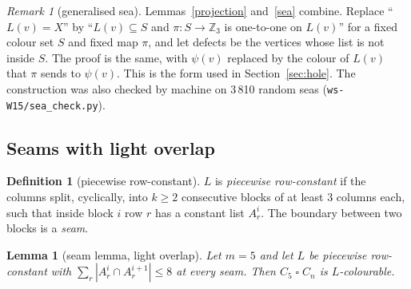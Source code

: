 \documentclass[11pt]{article}
\theoremstyle{plain}
\newtheorem{lemma}[theorem]{Lemma}
\theoremstyle{definition}
\newtheorem{definition}[theorem]{Definition}
\theoremstyle{remark}
\newtheorem{remark}[theorem]{Remark}
\newcommand{\T}{\mathbin{\square}}
\newcommand{\Z}{\mathbb{Z}}
\newcommand{\script}[1]{\texttt{#1}}
\begin{document}
\begin{remark}[generalised sea]\label{gensea}
Lemmas~\ref{projection} and~\ref{sea} combine. Replace ``$L(v) = X$'' by ``$L(v) \subseteq S$ and $\pi : S \to \Z_3$ is
one-to-one on $L(v)$'' for a fixed colour set $S$ and fixed map $\pi$, and let defects be the vertices whose list is not
inside $S$. The proof is the same, with $\psi(v)$ replaced by the colour of $L(v)$ that $\pi$ sends to $\psi(v)$. This is
the form used in Section~\ref{sec:hole}. The construction was also checked by machine on 3\,810 random seas
(\script{ws-W15/sea\_check.py}).
\end{remark}

\subsection{Seams with light overlap}

\begin{definition}[piecewise row-constant]\label{pwrc}
$L$ is \emph{piecewise row-constant} if the columns split, cyclically, into $k \ge 2$ consecutive blocks of at least
3 columns each, such that inside block $i$ row $r$ has a constant list $A^i_r$. The boundary between two blocks is a
\emph{seam}.
\end{definition}

\begin{lemma}[seam lemma, light overlap]\label{seamlight}
Let $m = 5$ and let $L$ be piecewise row-constant with $\sum_{r} |A^i_r \cap A^{i+1}_r| \le 8$ at every seam. Then
$C_5 \T C_n$ is $L$-colourable.
\end{lemma}
\end{document}
